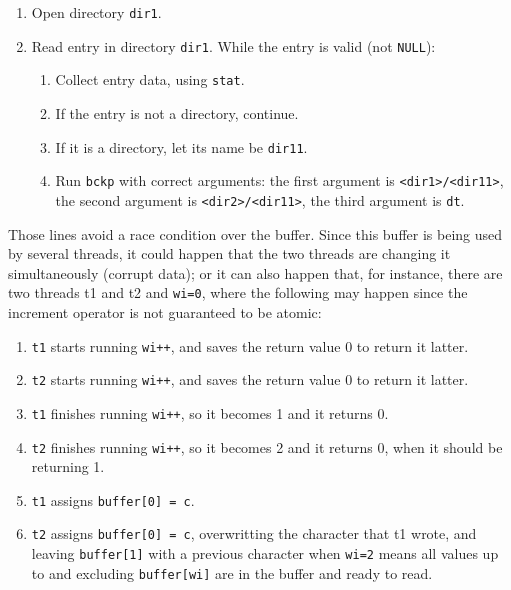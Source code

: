 \documentclass{sope}
\begin{document}
\begin{enumerate}[label=3.\arabic*]
    \item Open directory \texttt{dir1}.
    \item Read entry in directory \texttt{dir1}. While the entry is valid (not \texttt{NULL}):
    \begin{enumerate}[label*=.\arabic*]
        \item Collect entry data, using \texttt{stat}.
        \item If the entry is not a directory, continue.
        \item If it is a directory, let its name be \texttt{dir11}.
        \item Run \texttt{bckp} with correct arguments: the first argument is \texttt{<dir1>/<dir11>}, the second argument is \texttt{<dir2>/<dir11>}, the third argument is \texttt{dt}.
    \end{enumerate}
\end{enumerate}

\newpage
{}






Those lines avoid a race condition over the buffer. Since this buffer is being used by several threads, it could happen that the two threads are changing it simultaneously (corrupt data); or it can also happen that, for instance, there are two threads t1 and t2 and \texttt{wi=0}, where the following may happen since the increment operator is not guaranteed to be atomic:
\begin{enumerate}
    \item \texttt{t1} starts running \texttt{wi++}, and saves the return value 0 to return it latter.
    \item \texttt{t2} starts running \texttt{wi++}, and saves the return value 0 to return it latter.
    \item \texttt{t1} finishes running \texttt{wi++}, so it becomes 1 and it returns 0.
    \item \texttt{t2} finishes running \texttt{wi++}, so it becomes 2 and it returns 0, when it should be returning 1.
    \item \texttt{t1} assigns \texttt{buffer[0] = c}.
    \item \texttt{t2} assigns \texttt{buffer[0] = c}, overwritting the character that t1 wrote, and leaving \texttt{buffer[1]} with a previous character when \texttt{wi=2} means all values up to and excluding \texttt{buffer[wi]} are in the buffer and ready to read.
\end{enumerate}
\end{document}
